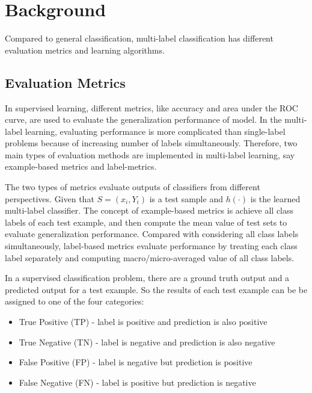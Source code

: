 
\chapter{Background} %
\label{Chapter6}

Compared to general classification, multi-label classification has different evaluation metrics and learning algorithms.

\section{Evaluation Metrics}

In supervised learning, different metrics, like accuracy and area under the ROC curve, are used to evaluate the generalization performance of model. In the multi-label learning, evaluating performance is more complicated  than single-label problems because of increasing number of labels simultaneously. Therefore, two main types of evaluation methods are implemented in multi-label learning, say example-based metrics\citep{ghamrawi2005collective} and label-metrics\citep{tsoumakas2007random}.

The two types of metrics evaluate outputs of classifiers from different perspectives. Given that $S = {(x_{i}, Y_{i})}$ is a test sample and $h(\cdot)$ is the learned multi-label classifier. The concept of example-based metrics is achieve all class labels of each test example, and then compute the mean value of test sets to evaluate generalization performance. Compared with considering all class labels simultaneously, label-based metrics evaluate performance by treating each class label separately and computing macro/micro-averaged value of all class labels.

In a supervised classification problem, there are a ground truth output and a predicted output for a test example. So the results of each test example can be be assigned to one of the four categories:
\begin{itemize}
\item True Positive (TP) - label is positive and prediction is also positive
\item True Negative (TN) - label is negative and prediction is also negative
\item False Positive (FP) - label is negative but prediction is positive
\item False Negative (FN) - label is positive but prediction is negative
\end{itemize}

